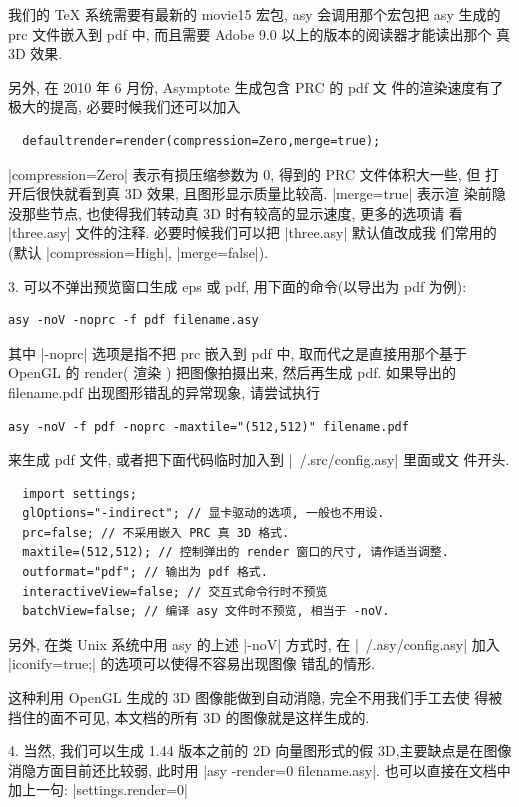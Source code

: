 \documentclass[nofonts,CJKnormalspaces]{ctexbook}[2009/05/20]
\begin{document}
我们的 TeX 系统需要有最新的 movie15 宏包, asy 会调用那个宏包把 asy 生成的
prc 文件嵌入到 pdf 中, 而且需要 Adobe 9.0 以上的版本的阅读器才能读出那个
真 3D 效果.

另外, 在 2010 年 6 月份, Asymptote 生成包含 PRC 的 pdf 文
件的渲染速度有了极大的提高, 必要时候我们还可以加入
\begin{lstlisting}
  defaultrender=render(compression=Zero,merge=true);
\end{lstlisting}
|compression=Zero| 表示有损压缩参数为 0, 得到的 PRC 文件体积大一些, 但
打开后很快就看到真 3D 效果, 且图形显示质量比较高. |merge=true| 表示渲
染前隐没那些节点, 也使得我们转动真 3D 时有较高的显示速度, 更多的选项请
看 |three.asy| 文件的注释. 必要时候我们可以把 |three.asy| 默认值改成我
们常用的(默认 |compression=High|, |merge=false|).


3.  可以不弹出预览窗口生成 eps 或 pdf, 用下面的命令(以导出为 pdf 为例):
\begin{verbatim}
asy -noV -noprc -f pdf filename.asy
\end{verbatim}

其中 |-noprc| 选项是指不把 prc 嵌入到 pdf 中, 取而代之是直接用那个基于
OpenGL 的 render( 渲染 ) 把图像拍摄出来, 然后再生成 pdf. 如果导出的
filename.pdf 出现图形错乱的异常现象, 请尝试执行
\begin{verbatim}
asy -noV -f pdf -noprc -maxtile="(512,512)" filename.pdf
\end{verbatim}
来生成 pdf 文件, 或者把下面代码临时加入到 |~/.src/config.asy| 里面或文
件开头.
\begin{lstlisting}
  import settings;
  glOptions="-indirect"; // 显卡驱动的选项, 一般也不用设.
  prc=false; // 不采用嵌入 PRC 真 3D 格式.
  maxtile=(512,512); // 控制弹出的 render 窗口的尺寸, 请作适当调整.
  outformat="pdf"; // 输出为 pdf 格式.
  interactiveView=false; // 交互式命令行时不预览
  batchView=false; // 编译 asy 文件时不预览, 相当于 -noV.
\end{lstlisting}

另外, 在类 Unix 系统中用 asy 的上述 |-noV| 方式时, 在
|~/.asy/config.asy| 加入 |iconify=true;| 的选项可以使得不容易出现图像
错乱的情形.


这种利用 OpenGL 生成的 3D 图像能做到自动消隐, 完全不用我们手工去使
得被挡住的面不可见, 本文档的所有 3D 的图像就是这样生成的.


4. 当然, 我们可以生成 1.44 版本之前的 2D 向量图形式的假 3D,主要缺点是在图像消隐方面目前还比较弱, 此时用
|asy -render=0 filename.asy|.
也可以直接在文档中加上一句: |settings.render=0|
\end{document}
